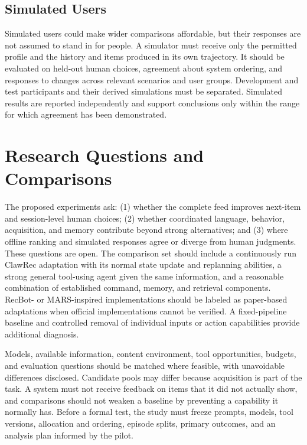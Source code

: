 \documentclass[11pt]{article}
\begin{document}
\subsection{Simulated Users}
Simulated users could make wider comparisons affordable, but their responses are not assumed to stand in for people. A simulator must receive only the permitted profile and the history and items produced in its own trajectory. It should be evaluated on held-out human choices, agreement about system ordering, and responses to changes across relevant scenarios and user groups. Development and test participants and their derived simulations must be separated. Simulated results are reported independently and support conclusions only within the range for which agreement has been demonstrated.

\section{Research Questions and Comparisons}
The proposed experiments ask: (1) whether the complete feed improves next-item and session-level human choices; (2) whether coordinated language, behavior, acquisition, and memory contribute beyond strong alternatives; and (3) where offline ranking and simulated responses agree or diverge from human judgments. These questions are open. The comparison set should include a continuously run ClawRec adaptation with its normal state update and replanning abilities, a strong general tool-using agent given the same information, and a reasonable combination of established command, memory, and retrieval components. RecBot- or MARS-inspired implementations should be labeled as paper-based adaptations when official implementations cannot be verified. A fixed-pipeline baseline and controlled removal of individual inputs or action capabilities provide additional diagnosis.

Models, available information, content environment, tool opportunities, budgets, and evaluation questions should be matched where feasible, with unavoidable differences disclosed. Candidate pools may differ because acquisition is part of the task. A system must not receive feedback on items that it did not actually show, and comparisons should not weaken a baseline by preventing a capability it normally has. Before a formal test, the study must freeze prompts, models, tool versions, allocation and ordering, episode splits, primary outcomes, and an analysis plan informed by the pilot.
\end{document}
